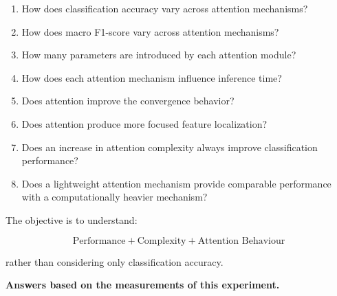 \documentclass[10pt]{article}
\begin{document}
\begin{enumerate}

\item How does classification accuracy vary across attention mechanisms?

\item How does macro F1-score vary across attention mechanisms?

\item How many parameters are introduced by each attention module?

\item How does each attention mechanism influence inference time?

\item Does attention improve the convergence behavior?

\item Does attention produce more focused feature localization?

\item Does an increase in attention complexity always improve classification
performance?

\item Does a lightweight attention mechanism provide comparable performance
with a computationally heavier mechanism?

\end{enumerate}

The objective is to understand:

\[
\boxed{
\text{Performance}
+
\text{Complexity}
+
\text{Attention Behaviour}
}
\]

rather than considering only classification accuracy.


\textbf{Answers based on the measurements of this experiment.}
\end{document}
